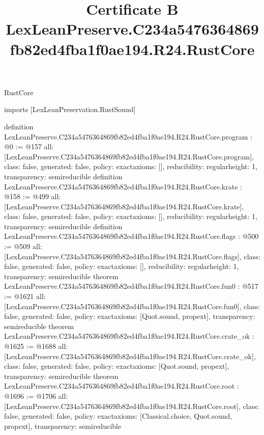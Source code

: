 \begin{lexlean}{RustCore}
\title{Certificate B LexLeanPreserve.C234a5476364869fb82ed4fba1f0ae194.R24.RustCore}
\begin{coremodule}
imports [LexLeanPreservation.RustSound]

definition LexLeanPreserve.C234a5476364869fb82ed4fba1f0ae194.R24.RustCore.program : @0 := @157 {
  all: [LexLeanPreserve.C234a5476364869fb82ed4fba1f0ae194.R24.RustCore.program],
  class: false,
  generated: false,
  policy: exact{axioms: []},
  reducibility: regular{height: 1},
  transparency: semireducible
}
definition LexLeanPreserve.C234a5476364869fb82ed4fba1f0ae194.R24.RustCore.krate : @158 := @499 {
  all: [LexLeanPreserve.C234a5476364869fb82ed4fba1f0ae194.R24.RustCore.krate],
  class: false,
  generated: false,
  policy: exact{axioms: []},
  reducibility: regular{height: 1},
  transparency: semireducible
}
definition LexLeanPreserve.C234a5476364869fb82ed4fba1f0ae194.R24.RustCore.flags : @500 := @509 {
  all: [LexLeanPreserve.C234a5476364869fb82ed4fba1f0ae194.R24.RustCore.flags],
  class: false,
  generated: false,
  policy: exact{axioms: []},
  reducibility: regular{height: 1},
  transparency: semireducible
}
theorem LexLeanPreserve.C234a5476364869fb82ed4fba1f0ae194.R24.RustCore.fun0 : @517 := @1621 {
  all: [LexLeanPreserve.C234a5476364869fb82ed4fba1f0ae194.R24.RustCore.fun0],
  class: false,
  generated: false,
  policy: exact{axioms: [Quot.sound, propext]},
  transparency: semireducible
}
theorem LexLeanPreserve.C234a5476364869fb82ed4fba1f0ae194.R24.RustCore.crate_ok : @1625 := @1688 {
  all: [LexLeanPreserve.C234a5476364869fb82ed4fba1f0ae194.R24.RustCore.crate_ok],
  class: false,
  generated: false,
  policy: exact{axioms: [Quot.sound, propext]},
  transparency: semireducible
}
theorem LexLeanPreserve.C234a5476364869fb82ed4fba1f0ae194.R24.RustCore.root : @1696 := @1706 {
  all: [LexLeanPreserve.C234a5476364869fb82ed4fba1f0ae194.R24.RustCore.root],
  class: false,
  generated: false,
  policy: exact{axioms: [Classical.choice, Quot.sound, propext]},
  transparency: semireducible
}


\end{coremodule}
\end{lexlean}
